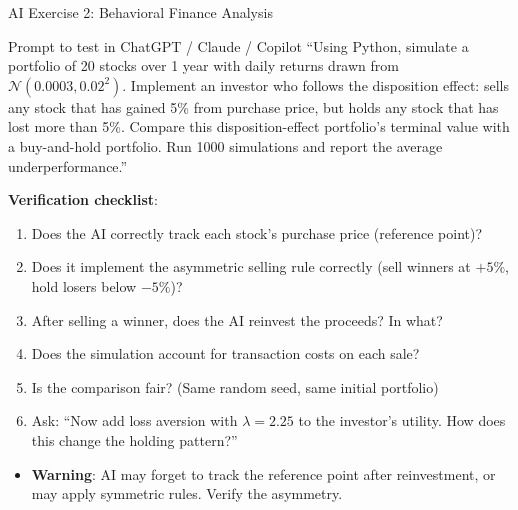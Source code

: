 \documentclass[9pt, aspectratio=169, t]{beamer}
\theoremstyle{definition}
\newenvironment{cminipage}[1]{%
    \par\noindent\hfill\begin{minipage}{#1}\ignorespaces
}{%
    \end{minipage}\hfill\null\par
}
\begin{document}
\begin{frame}[shrink=3]{AI Exercise 2: Behavioral Finance Analysis}
    \begin{cminipage}{0.95\textwidth}
    \begin{block}{\footnotesize Prompt to test in ChatGPT / Claude / Copilot}
        {\small
        ``Using Python, simulate a portfolio of 20 stocks over 1 year with daily returns drawn from $\mathcal{N}(0.0003, 0.02^2)$. Implement an investor who follows the disposition effect: sells any stock that has gained 5\% from purchase price, but holds any stock that has lost more than 5\%. Compare this disposition-effect portfolio's terminal value with a buy-and-hold portfolio. Run 1000 simulations and report the average underperformance.''}
    \end{block}
    \vspace{-1mm}
    {\small
    \textbf{Verification checklist}:
    \begin{enumerate}
        \item Does the AI correctly track each stock's purchase price (reference point)?
        \item Does it implement the asymmetric selling rule correctly (sell winners at $+5\%$, hold losers below $-5\%$)?
        \item After selling a winner, does the AI reinvest the proceeds? In what?
        \item Does the simulation account for transaction costs on each sale?
        \item Is the comparison fair? (Same random seed, same initial portfolio)
        \item Ask: ``Now add loss aversion with $\lambda = 2.25$ to the investor's utility. How does this change the holding pattern?''
    \end{enumerate}
    }
    \vspace{-1mm}
    \begin{alertblock}{}
        {\small
        \begin{itemize}\setlength{\itemsep}{0pt}
            \item \textbf{Warning}: AI may forget to track the reference point after reinvestment, or may apply symmetric rules. Verify the asymmetry.
        \end{itemize}
        }
    \end{alertblock}
    \end{cminipage}
\end{frame}
\end{document}
